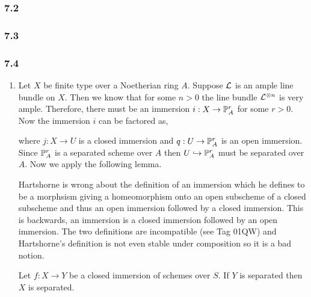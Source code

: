 \documentclass[12pt]{article}
\begin{document}
\subsubsection{7.2}

\subsubsection{7.3}

\subsubsection{7.4}

\begin{enumerate}
\item Let $X$ be finite type over a Noetherian ring $A$. Suppose $\L$ is an ample line bundle on $X$. Then we know that for some $n > 0$ the line bundle $\L^{\otimes n}$ is very ample. Therefore, there must be an immersion $i : X \to \P^r_A$ for some $r > 0$. Now the immersion $i$ can be factored as,
\begin{center}
\end{center} 
where $j : X \to U$ is a closed immersion and $q : U \to \P^r_A$ is an open immersion. Since $\P^r_A$ is a separated scheme over $A$ then $U \embed \P^r_A$ must be separated over $A$. Now we apply the following lemma. 

\begin{remark}
Hartshorne is wrong about the definition of an immersion which he defines to be a morphsism giving a homeomorphism onto an open subscheme of a closed subscheme and thus an open immersion followed by a closed immersion. This is backwards, an immersion is a closed immersion followed by an open immersion. The two definitions are incompatible (see Tag 01QW) and Hartshorne's definition is not even stable under composition so it is a bad notion.  
\end{remark}

\begin{lemma}
Let $f : X \to Y$ be a closed immersion of schemes over $S$. If $Y$ is separated then $X$ is separated.
\end{lemma}


\end{enumerate}
\end{document}
